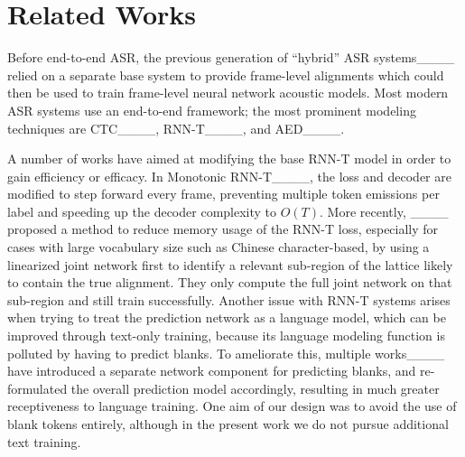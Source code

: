 \section{Related Works}
\label{related}




Before end-to-end ASR, the previous generation of ``hybrid'' ASR systems____ relied on a separate base system to provide frame-level alignments which could then be used to train frame-level neural network acoustic models.  Most modern ASR systems use an end-to-end framework; the most prominent modeling techniques are CTC____, RNN-T____, and AED____.

A number of works have aimed at modifying the base RNN-T model in order to gain efficiency or efficacy.  In Monotonic RNN-T____, the loss and decoder are modified to step forward every frame, preventing multiple token emissions per label and speeding up the decoder complexity to $O(T)$.  More recently, ____ proposed a method to reduce memory usage of the RNN-T loss, especially for cases with large vocabulary size such as Chinese character-based, by using a linearized joint network first to identify a relevant sub-region of the lattice likely to contain the true alignment.  They only compute the full joint network on that sub-region and still train successfully.  Another issue with RNN-T systems arises when trying to treat the prediction network as a language model, which can be improved through text-only training, because its language modeling function is polluted by having to predict blanks.  To ameliorate this, multiple works____ have introduced a separate network component for predicting blanks, and re-formulated the overall prediction model accordingly, resulting in much greater receptiveness to language training.  One aim of our design was to avoid the use of blank tokens entirely, although in the present work we do not pursue additional text training.  

